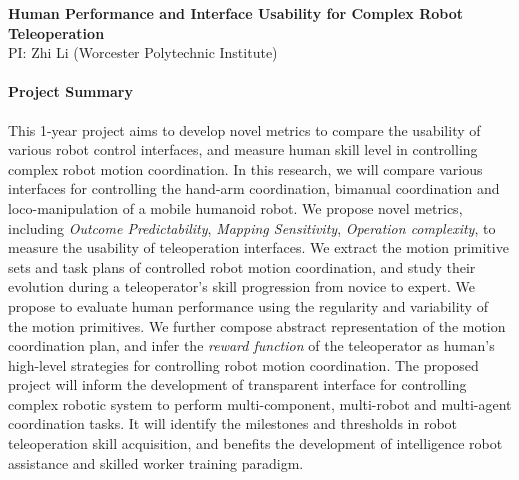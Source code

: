 \pagebreak

\begin{center}
	{\Large \bf Human Performance and Interface Usability for Complex Robot Teleoperation}\\
    \vspace{4pt}
   	{\large PI: Zhi Li (Worcester Polytechnic Institute)}
\end{center}

\vspace{1 em}

\paragraph*{\Large Project Summary} 
This 1-year project aims to develop novel metrics to compare the usability of various robot control interfaces, and measure human skill level in controlling complex robot motion coordination. In this research, we will compare various interfaces for controlling the hand-arm coordination, bimanual coordination and loco-manipulation of a mobile humanoid robot. We propose novel metrics, including \textit{Outcome Predictability}, \textit{Mapping Sensitivity}, \textit{Operation complexity}, to measure the usability of teleoperation interfaces. We extract the motion primitive sets and task plans of controlled robot motion coordination, and study their evolution during a teleoperator's skill progression from novice to expert. We propose to evaluate human performance using the regularity and variability of the motion primitives. We further compose abstract representation of the motion coordination plan, and infer the \textit{reward function} of the teleoperator as human's high-level strategies for controlling robot motion coordination. The proposed project will inform the development of transparent interface for controlling complex robotic system to perform multi-component, multi-robot and multi-agent coordination tasks. It will identify the milestones and thresholds in robot teleoperation skill acquisition, and benefits the development of intelligence robot assistance and skilled worker training paradigm.  









